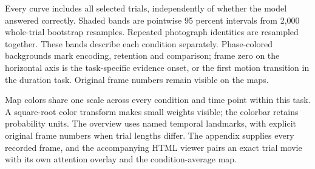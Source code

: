 \documentclass[11pt]{article}
\begin{document}
Every curve includes all selected trials, independently of whether the model answered correctly. Shaded bands are pointwise 95 percent intervals from 2,000 whole-trial bootstrap resamples. Repeated photograph identities are resampled together. These bands describe each condition separately. Phase-colored backgrounds mark encoding, retention and comparison; frame zero on the horizontal axis is the task-specific evidence onset, or the first motion transition in the duration task. Original frame numbers remain visible on the maps.

Map colors share one scale across every condition and time point within this task. A square-root color transform makes small weights visible; the colorbar retains probability units. The overview uses named temporal landmarks, with explicit original frame numbers when trial lengths differ. The appendix supplies every recorded frame, and the accompanying HTML viewer pairs an exact trial movie with its own attention overlay and the condition-average map.
\end{document}
